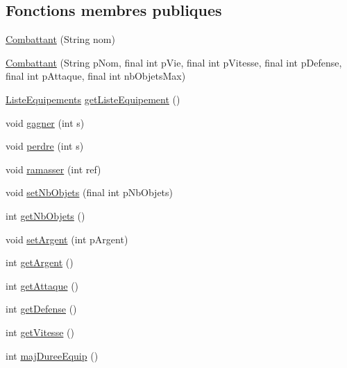 \subsection*{Fonctions membres publiques}
\begin{DoxyCompactItemize}
\item 
\hyperlink{classindividu_1_1combattant_1_1_combattant_a4526e69f52d47876558f1c9cc10964db}{Combattant} (String nom)
\item 
\hyperlink{classindividu_1_1combattant_1_1_combattant_a9b9b0d6f38ad02317260adc9d08b612f}{Combattant} (String p\-Nom, final int p\-Vie, final int p\-Vitesse, final int p\-Defense, final int p\-Attaque, final int nb\-Objets\-Max)
\item 
\hyperlink{classindividu_1_1combattant_1_1_liste_equipements}{Liste\-Equipements} \hyperlink{classindividu_1_1combattant_1_1_combattant_a9d380a0a35876f99898fe7567cae32b9}{get\-Liste\-Equipement} ()
\item 
void \hyperlink{classindividu_1_1combattant_1_1_combattant_a2cf4b27020ffa07f6b6770dfd1654bc4}{gagner} (int s)
\item 
void \hyperlink{classindividu_1_1combattant_1_1_combattant_a46767973062954ee738e28856f1b6c6e}{perdre} (int s)
\item 
void \hyperlink{classindividu_1_1combattant_1_1_combattant_a7d56bc66f5eab04efdeeb748e29d1859}{ramasser} (int ref)
\item 
void \hyperlink{classindividu_1_1combattant_1_1_combattant_a127950f43fa0397daa5e23616bf6340c}{set\-Nb\-Objets} (final int p\-Nb\-Objets)
\item 
int \hyperlink{classindividu_1_1combattant_1_1_combattant_afe9afbb1b4d2b169054d1b3b31c1c362}{get\-Nb\-Objets} ()
\item 
void \hyperlink{classindividu_1_1combattant_1_1_combattant_a1d524c5ad7fc24f3210d7371363e5969}{set\-Argent} (int p\-Argent)
\item 
int \hyperlink{classindividu_1_1combattant_1_1_combattant_a1a6e4767d3b9bae8e913c427db5ffc64}{get\-Argent} ()
\item 
int \hyperlink{classindividu_1_1combattant_1_1_combattant_ad63c7efc58a08fbd0e76f43e0bbccd68}{get\-Attaque} ()
\item 
int \hyperlink{classindividu_1_1combattant_1_1_combattant_afda5816b9a5d7c44d24e3a870c779754}{get\-Defense} ()
\item 
int \hyperlink{classindividu_1_1combattant_1_1_combattant_ad04833b8576cf9933e2c6dd3e04269e8}{get\-Vitesse} ()
\item 
int \hyperlink{classindividu_1_1combattant_1_1_combattant_a08cc33106893423b5debcc5a8e7c1e34}{maj\-Duree\-Equip} ()
\end{DoxyCompactItemize}
